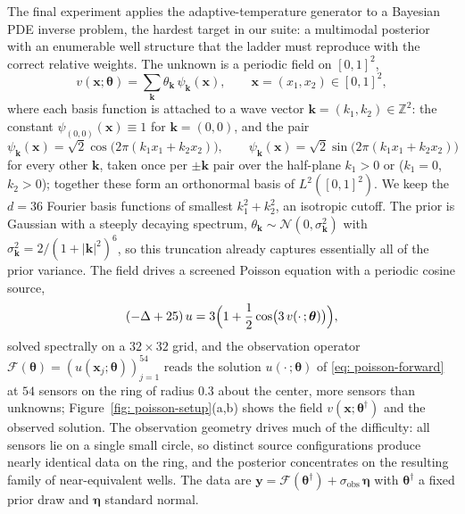 \documentclass{article}
\begin{document}
The final experiment applies the adaptive-temperature generator to a Bayesian PDE inverse problem, the hardest target in our suite: a multimodal posterior with an enumerable well structure that the ladder must reproduce with the correct relative weights. The unknown is a periodic field on $[0,1]^2$,
\begin{equation*}
    v(\mathbf{x}; \boldsymbol{\theta}) = \sum_{\mathbf{k}} \theta_{\mathbf{k}}\, \psi_{\mathbf{k}}(\mathbf{x}),
    \qquad
    \mathbf{x} = (x_1, x_2) \in [0,1]^2,
\end{equation*}
where each basis function is attached to a wave vector $\mathbf{k} = (k_1, k_2) \in \mathbb Z^2$: the constant $\psi_{(0,0)}(\mathbf{x}) \equiv 1$ for $\mathbf{k} = (0,0)$, and the pair
\begin{equation*}
    \psi_{\mathbf{k}}(\mathbf{x}) = \sqrt{2}\cos\bigl(2\pi (k_1 x_1 + k_2 x_2)\bigr),
    \qquad
    \psi_{\mathbf{k}}(\mathbf{x}) = \sqrt{2}\sin\bigl(2\pi (k_1 x_1 + k_2 x_2)\bigr)
\end{equation*}
for every other $\mathbf{k}$, taken once per $\pm \mathbf{k}$ pair over the half-plane $k_1 > 0$ or ($k_1 = 0$, $k_2 > 0$); together these form an orthonormal basis of $L^2([0,1]^2)$. We keep the $d = 36$ Fourier basis functions of smallest $k_1^2 + k_2^2$, an isotropic cutoff. The prior is Gaussian with a steeply decaying spectrum, $\theta_{\mathbf{k}} \sim \mathcal N(0, \sigma_{\mathbf{k}}^2)$ with $\sigma_{\mathbf{k}}^2 = 2/(1 + |\mathbf{k}|^2)^{6}$, so this truncation already captures essentially all of the prior variance. The field drives a screened Poisson equation with a periodic cosine source,
\begin{equation}
    (-\Delta + 25)\, u = 3 \Bigl(1 + \frac12 \cos\bigl(3\, v(\cdot\,; \boldsymbol{\theta})\bigr)\Bigr),
    \label{eq: poisson-forward}
\end{equation}
solved spectrally on a $32 \times 32$ grid, and the observation operator $\mathcal{F}(\boldsymbol{\theta}) = (u(\mathbf{x}_j;\boldsymbol{\theta}))_{j=1}^{54}$ reads the solution $u(\cdot\,;\boldsymbol{\theta})$ of \eqref{eq: poisson-forward} at $54$ sensors on the ring of radius $0.3$ about the center, more sensors than unknowns; Figure~\ref{fig: poisson-setup}(a,b) shows the field $v(\mathbf{x};\boldsymbol{\theta}^\dagger)$ and the observed solution. The observation geometry drives much of the difficulty: all sensors lie on a single small circle, so distinct source configurations produce nearly identical data on the ring, and the posterior concentrates on the resulting family of near-equivalent wells. The data are $\mathbf{y} = \mathcal{F}(\boldsymbol{\theta}^\dagger) + \sigma_{\mathrm{obs}}\, \boldsymbol{\eta}$ with $\boldsymbol{\theta}^\dagger$ a fixed prior draw and $\boldsymbol{\eta}$ standard normal.
\end{document}
